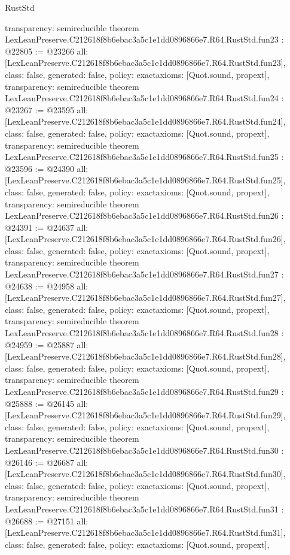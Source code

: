 \begin{lexlean}{RustStd}
\begin{coremodule}
{  transparency: semireducible
}
theorem LexLeanPreserve.C212618f8b6ebac3a5c1e1dd0896866e7.R64.RustStd.fun23 : @22805 := @23266 {
  all: [LexLeanPreserve.C212618f8b6ebac3a5c1e1dd0896866e7.R64.RustStd.fun23],
  class: false,
  generated: false,
  policy: exact{axioms: [Quot.sound, propext]},
  transparency: semireducible
}
theorem LexLeanPreserve.C212618f8b6ebac3a5c1e1dd0896866e7.R64.RustStd.fun24 : @23267 := @23595 {
  all: [LexLeanPreserve.C212618f8b6ebac3a5c1e1dd0896866e7.R64.RustStd.fun24],
  class: false,
  generated: false,
  policy: exact{axioms: [Quot.sound, propext]},
  transparency: semireducible
}
theorem LexLeanPreserve.C212618f8b6ebac3a5c1e1dd0896866e7.R64.RustStd.fun25 : @23596 := @24390 {
  all: [LexLeanPreserve.C212618f8b6ebac3a5c1e1dd0896866e7.R64.RustStd.fun25],
  class: false,
  generated: false,
  policy: exact{axioms: [Quot.sound, propext]},
  transparency: semireducible
}
theorem LexLeanPreserve.C212618f8b6ebac3a5c1e1dd0896866e7.R64.RustStd.fun26 : @24391 := @24637 {
  all: [LexLeanPreserve.C212618f8b6ebac3a5c1e1dd0896866e7.R64.RustStd.fun26],
  class: false,
  generated: false,
  policy: exact{axioms: [Quot.sound, propext]},
  transparency: semireducible
}
theorem LexLeanPreserve.C212618f8b6ebac3a5c1e1dd0896866e7.R64.RustStd.fun27 : @24638 := @24958 {
  all: [LexLeanPreserve.C212618f8b6ebac3a5c1e1dd0896866e7.R64.RustStd.fun27],
  class: false,
  generated: false,
  policy: exact{axioms: [Quot.sound, propext]},
  transparency: semireducible
}
theorem LexLeanPreserve.C212618f8b6ebac3a5c1e1dd0896866e7.R64.RustStd.fun28 : @24959 := @25887 {
  all: [LexLeanPreserve.C212618f8b6ebac3a5c1e1dd0896866e7.R64.RustStd.fun28],
  class: false,
  generated: false,
  policy: exact{axioms: [Quot.sound, propext]},
  transparency: semireducible
}
theorem LexLeanPreserve.C212618f8b6ebac3a5c1e1dd0896866e7.R64.RustStd.fun29 : @25888 := @26145 {
  all: [LexLeanPreserve.C212618f8b6ebac3a5c1e1dd0896866e7.R64.RustStd.fun29],
  class: false,
  generated: false,
  policy: exact{axioms: [Quot.sound, propext]},
  transparency: semireducible
}
theorem LexLeanPreserve.C212618f8b6ebac3a5c1e1dd0896866e7.R64.RustStd.fun30 : @26146 := @26687 {
  all: [LexLeanPreserve.C212618f8b6ebac3a5c1e1dd0896866e7.R64.RustStd.fun30],
  class: false,
  generated: false,
  policy: exact{axioms: [Quot.sound, propext]},
  transparency: semireducible
}
theorem LexLeanPreserve.C212618f8b6ebac3a5c1e1dd0896866e7.R64.RustStd.fun31 : @26688 := @27151 {
  all: [LexLeanPreserve.C212618f8b6ebac3a5c1e1dd0896866e7.R64.RustStd.fun31],
  class: false,
  generated: false,
  policy: exact{axioms: [Quot.sound, propext]},
}
\end{coremodule}
\end{lexlean}
